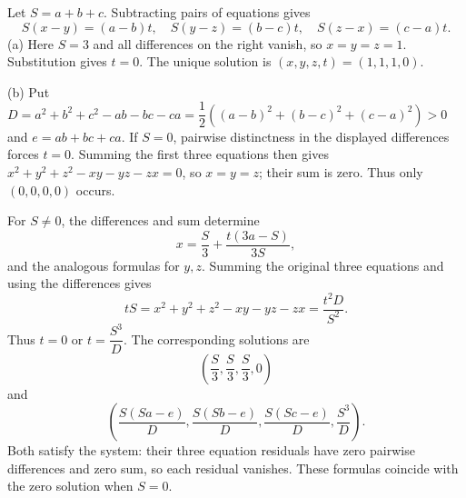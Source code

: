 Let $S=a+b+c$. Subtracting pairs of equations gives
\[
S(x-y)=(a-b)t,\quad S(y-z)=(b-c)t,\quad S(z-x)=(c-a)t.
\]
(a) Here $S=3$ and all differences on the right vanish, so $x=y=z=1$. Substitution gives $t=0$. The unique solution is $\boxed{(x,y,z,t)=(1,1,1,0)}$.

(b) Put $D=a^2+b^2+c^2-ab-bc-ca=\dfrac{1}{2}((a-b)^2+(b-c)^2+(c-a)^2)>0$ and $e=ab+bc+ca$.
If $S=0$, pairwise distinctness in the displayed differences forces $t=0$. Summing the first three equations then gives $x^2+y^2+z^2-xy-yz-zx=0$, so $x=y=z$; their sum is zero. Thus only $(0,0,0,0)$ occurs.

For $S\ne0$, the differences and sum determine
\[
x=\dfrac{S}{3}+\dfrac{t(3a-S)}{3S},
\]
and the analogous formulas for $y,z$. Summing the original three equations and using the differences gives
\[
tS=x^2+y^2+z^2-xy-yz-zx=\dfrac{t^2D}{S^2}.
\]
Thus $t=0$ or $t=\dfrac{S^3}{D}$. The corresponding solutions are
\[
\boxed{\left(\dfrac{S}{3},\dfrac{S}{3},\dfrac{S}{3},0\right)}
\]
and
\[
\boxed{\left(\dfrac{S(Sa-e)}{D},\dfrac{S(Sb-e)}{D},\dfrac{S(Sc-e)}{D},\dfrac{S^3}{D}\right)}.
\]
Both satisfy the system: their three equation residuals have zero pairwise differences and zero sum, so each residual vanishes. These formulas coincide with the zero solution when $S=0$.
